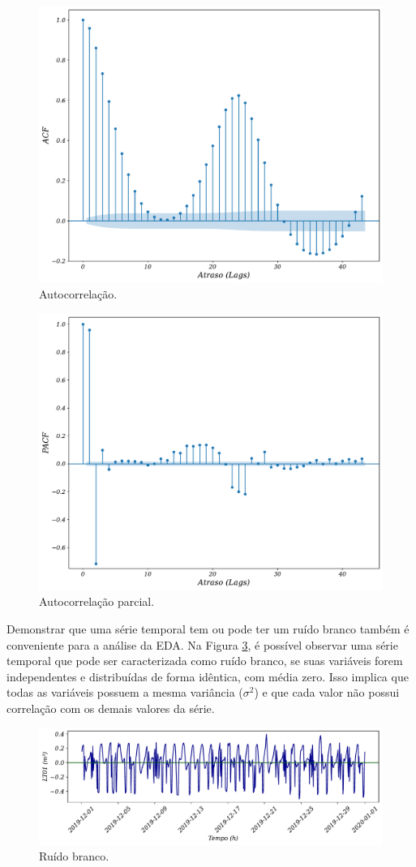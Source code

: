 \begin{figure}[!htb]
	\centering
\caption{Autocorrelação.}\label{fig:acfa}	\includegraphics[width=0.7\linewidth]{Resultados/Figuras/acf} 
\end{figure}

\begin{figure}[!htb]
	\centering
	\caption{Autocorrelação parcial.}\label{fig:pacf}	\includegraphics[width=0.7\linewidth]{Resultados/Figuras/pacf}
\end{figure}

Demonstrar que uma série temporal tem ou pode ter um ruído branco também é conveniente para a análise da EDA.
Na Figura \ref{fig:ruido-branco}, é possível observar uma série temporal que pode ser caracterizada como ruído branco, se suas variáveis forem independentes e distribuídas de forma idêntica, com média zero. Isso implica que todas as variáveis possuem a mesma variância ($\sigma^2$) e que cada valor não possui correlação com os demais valores da série.

\begin{figure}[!htb]
	\centering
	\caption{Ruído branco.}
	\label{fig:ruido-branco}
	\includegraphics[width=\linewidth]{Resultados/Figuras/ruido-branco}
\end{figure}

